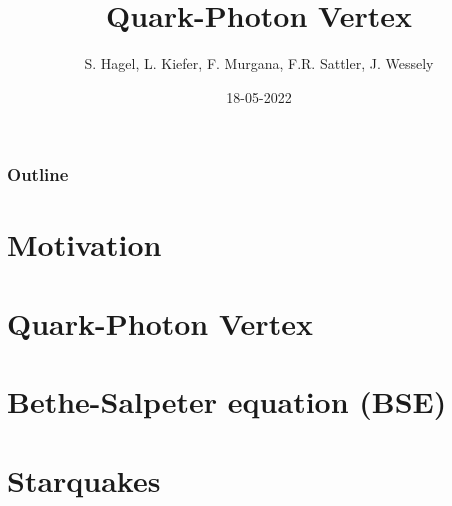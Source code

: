 \documentclass[pt12]{beamer}
\title[ECT* DTP 2022]{Quark-Photon Vertex}
\author{S. Hagel, L. Kiefer, F. Murgana, F.R. Sattler, J. Wessely}
\date{18-05-2022}
\newcommand{\backupbegin}{
   \newcounter{framenumberappendix}
   \setcounter{framenumberappendix}{\value{framenumber}}
}
\begin{document}
\begin{frame}[plain]
\titlepage
\end{frame}



\begin{frame}[label=outline]
\frametitle{Outline}
\tableofcontents[pausesections]
\end{frame}

\section{Motivation}


\section{Quark-Photon Vertex}



\section{Bethe-Salpeter equation (BSE)}







%

\section{Starquakes}
%

%


%
\end{document}
